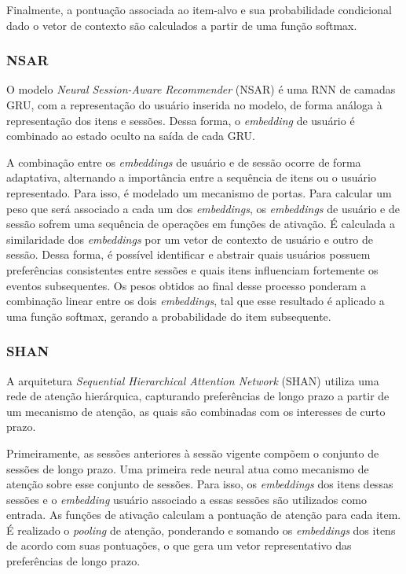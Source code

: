 Finalmente, a pontuação associada ao item-alvo e sua probabilidade condicional
dado o vetor de contexto são calculados a partir de uma função softmax.
  
\subsubsection{NSAR}
O modelo \textit{Neural Session-Aware Recommender} (NSAR) é uma RNN de camadas GRU,
com a representação do usuário inserida no modelo, de forma análoga à
representação dos itens e sessões. Dessa forma, o \textit{embedding} de usuário
é combinado ao estado oculto na saída de cada GRU.

A combinação entre os \textit{embeddings} de usuário e de sessão ocorre de forma
adaptativa, alternando a importância entre a sequência de itens ou o usuário
representado. Para isso, é modelado um mecanismo de portas. Para calcular um
peso que será associado a cada um dos \textit{embeddings}, os
\textit{embeddings} de usuário e de sessão sofrem uma sequência de operações em
funções de ativação. É calculada a similaridade dos \textit{embeddings} por um
vetor de contexto de usuário e outro de sessão. Dessa forma, é possível
identificar e abstrair quais usuários possuem preferências consistentes entre
sessões e quais itens influenciam fortemente os eventos subsequentes. Os pesos
obtidos ao final desse processo ponderam a combinação linear entre os dois
\textit{embeddings}, tal que esse resultado é aplicado a uma função softmax,
gerando a probabilidade do item subsequente.

\subsubsection{SHAN}
A arquitetura \textit{Sequential Hierarchical Attention Network} (SHAN) utiliza uma rede
de atenção hierárquica, capturando preferências de longo prazo a partir de um
mecanismo de atenção, as quais são combinadas com os interesses de curto
prazo\cite{shan}.

Primeiramente, as sessões anteriores à sessão vigente compõem o conjunto de
sessões de longo prazo. Uma primeira rede neural atua como mecanismo de atenção
sobre esse conjunto de sessões. Para isso, os \textit{embeddings} dos itens
dessas sessões e o \textit{embedding} usuário associado a essas sessões são
utilizados como entrada. As funções de ativação calculam a pontuação de atenção
para cada item. É realizado o \textit{pooling} de atenção, ponderando e somando
os \textit{embeddings} dos itens de acordo com suas pontuações, o que gera um
vetor representativo das preferências de longo prazo.

